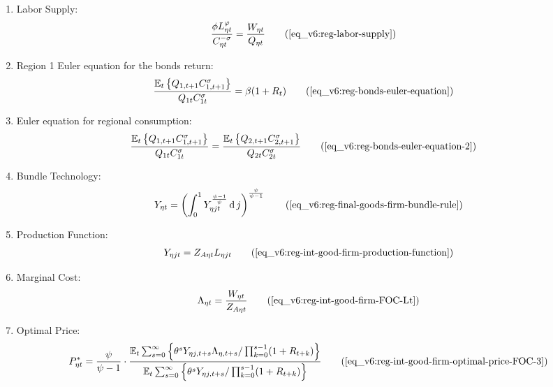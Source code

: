 \documentclass[../thesis.tex]{subfiles}
\begin{document}
{\begin{itemize}
\begin{enumerate}
\begin{comment}
\end{comment}
		
		\item Labor Supply:
		\begin{align}
			\frac{\phi L_{\eta t}^{\varphi}}{C_{\eta t}^{-\sigma}} &= \frac{W_{\eta t}}{Q_{\eta t}} \tag{\ref{eq_v6:reg-labor-supply}}
		\end{align}

		\item Region 1 Euler equation for the bonds return:
		\begin{align}
			\frac{\mathbb{E}_{t} \left\{Q_{1, t+1} C_{1, t+1}^{\sigma} \right\}}{Q_{1t} C_{1t}^{\sigma}} &= \beta (1 + R_{t}) \tag{\ref{eq_v6:reg-bonds-euler-equation}}
		\end{align}
		
		\item Euler equation for regional consumption:
		\begin{align}
			\frac{\mathbb{E}_{t} \left\{ Q_{1, t+1} C_{1, t+1}^{\sigma} \right\}}{Q_{1t} C_{1t}^{\sigma}} &= \frac{\mathbb{E}_{t} \left\{ Q_{2, t+1} C_{2, t+1}^{\sigma} \right\}}{Q_{2t} C_{2t}^{\sigma}} \tag{\ref{eq_v6:reg-bonds-euler-equation-2}}
		\end{align}
		
		\item Bundle Technology:
		\begin{align}
			Y_{\eta t} = \left( \int_{0}^{1} Y_{\eta jt}^{\frac{\psi-1}{\psi}} \dif j \right)^{\frac{\psi}{\psi-1}} \tag{\ref{eq_v6:reg-final-goods-firm-bundle-rule}}
		\end{align}
		
		\item Production Function:
		\begin{align}
			Y_{\eta jt} = Z_{A\eta t} L_{\eta jt} \tag{\ref{eq_v6:reg-int-good-firm-production-function}}
		\end{align}

		\item Marginal Cost:
		\begin{align}
			\Lambda_{\eta t} = \frac{W_{\eta t}}{Z_{A\eta t}} \tag{\ref{eq_v6:reg-int-good-firm-FOC-Lt}}
		\end{align}

		\item Optimal Price:
		\begin{align}
			P_{\eta t}^{\ast} = \frac{\psi}{\psi-1} \cdot \frac{ \E \sum_{s=0}^{\infty} \left\{ \theta^s Y_{\eta j,t+s} \Lambda_{\eta, t+s} / \prod_{k=0}^{s-1}(1+R_{t+k}) \right\}} {\E \sum_{s=0}^{\infty} \left\{ \theta^s Y_{\eta j,t+s} / \prod_{k=0}^{s-1}(1 + R_{t+k}) \right\}} \tag{\ref{eq_v6:reg-int-good-firm-optimal-price-FOC-3}}
		\end{align}
		

\end{enumerate}
\end{itemize}}
\end{document}
